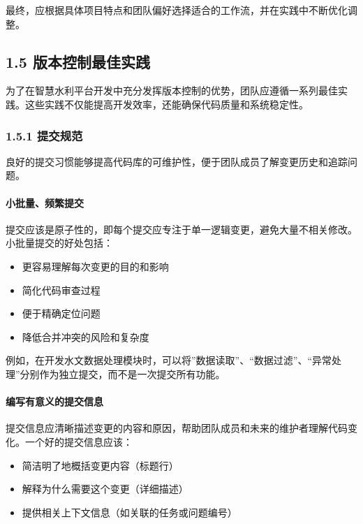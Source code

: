 最终，应根据具体项目特点和团队偏好选择适合的工作流，并在实践中不断优化调整。

\subsection{1.5
版本控制最佳实践}\label{ux7248ux672cux63a7ux5236ux6700ux4f73ux5b9eux8df5}

为了在智慧水利平台开发中充分发挥版本控制的优势，团队应遵循一系列最佳实践。这些实践不仅能提高开发效率，还能确保代码质量和系统稳定性。

\subsubsection{1.5.1 提交规范}\label{ux63d0ux4ea4ux89c4ux8303}

良好的提交习惯能够提高代码库的可维护性，便于团队成员了解变更历史和追踪问题。

\paragraph{小批量、频繁提交}\label{ux5c0fux6279ux91cfux9891ux7e41ux63d0ux4ea4}

提交应该是原子性的，即每个提交应专注于单一逻辑变更，避免大量不相关修改。小批量提交的好处包括：

\begin{itemize}
\tightlist
\item
  更容易理解每次变更的目的和影响
\item
  简化代码审查过程
\item
  便于精确定位问题
\item
  降低合并冲突的风险和复杂度
\end{itemize}

例如，在开发水文数据处理模块时，可以将''数据读取''、``数据过滤''、``异常处理''分别作为独立提交，而不是一次提交所有功能。

\paragraph{编写有意义的提交信息}\label{ux7f16ux5199ux6709ux610fux4e49ux7684ux63d0ux4ea4ux4fe1ux606f}

提交信息应清晰描述变更的内容和原因，帮助团队成员和未来的维护者理解代码变化。一个好的提交信息应该：

\begin{itemize}
\tightlist
\item
  简洁明了地概括变更内容（标题行）
\item
  解释为什么需要这个变更（详细描述）
\item
  提供相关上下文信息（如关联的任务或问题编号）
\end{itemize}


